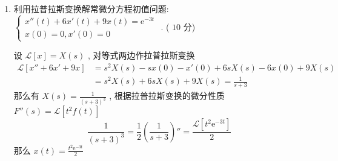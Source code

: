 \documentclass[cn,11pt,fancy,hide]{elegantbook}
\newcommand{\ee}{\mathrm{e}}
\newcommand{\LL}{\mathscr{L}}
\begin{document}
\begin{enumerate}
\begin{solution}
	\end{solution}
	
	\item 利用拉普拉斯变换解常微分方程初值问题: $\begin{cases}
	x''(t)+6x'(t)+9x(t)=\ee^{-3t}\\
	x(0)=0, x'(0)=0
	\end{cases}$ . ( $10$ 分)
	\begin{solution}
		设 $\LL[x]=X(s)$ , 对等式两边作拉普拉斯变换
		\begin{align*}
			\LL[x''+6x'+9x]&=s^2X(s)-sx(0)-x'(0)+6sX(s)-6x(0)+9X(s)\\
			&=s^2X(s)+6sX(s)+9X(s)=\frac{1}{s+3}
		\end{align*}
		那么有 $X(s)=\frac{1}{(s+3)^3}$ , 根据拉普拉斯变换的微分性质 $F''(s)=\LL[t^2f(t)]$
		\begin{equation*}
			\frac{1}{(s+3)^3}=\frac{1}{2}\left(\frac{1}{s+3} \right)''=\frac{\LL[t^2\ee^{-3t}]}{2}
		\end{equation*}
		那么 $x(t)=\frac{t^2\ee^{-3t}}{2}$
	\end{solution}
\end{enumerate}
\end{document}
